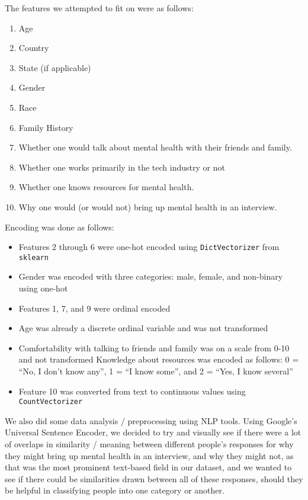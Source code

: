 \documentclass[times, twocolumn]{article}
\begin{document}
The features we attempted to fit on were as follows:

\begin{enumerate}
    \item Age
    \item Country
    \item State (if applicable)
    \item Gender
    \item Race
    \item Family History
    \item Whether one would talk about mental health with their friends and family.
    \item Whether one works primarily in the tech industry or not
    \item Whether one knows resources for mental health.
    \item Why one would (or would not) bring up mental health in an interview.
\end{enumerate}

Encoding was done as follows:

\begin{itemize}
    \item Features 2 through 6 were one-hot encoded using \texttt{DictVectorizer} from \texttt{sklearn}
    \item Gender was encoded with three categories: male, female, and non-binary using one-hot
    \item Features 1, 7, and 9 were ordinal encoded
    \item Age was already a discrete ordinal variable and was not transformed
    \item Comfortability with talking to friends and family was on a scale from 0-10 and not transformed
Knowledge about resources was encoded as follows: 0 = “No, I don’t know any”, 1 = “I know some”, and 2 = “Yes, I know several”
    \item Feature 10 was converted from text to continuous values using \texttt{CountVectorizer}
\end{itemize}

We also did some data analysis / preprocessing using NLP tools. Using Google’s
Universal Sentence Encoder, we decided to try and visually see if there were a lot
of overlaps in similarity / meaning between different people’s responses for
why they might bring up mental health in an interview, and why they might not,
as that was the most prominent text-based field in our dataset, and we wanted to
see if there could be similarities drawn between all of these responses, should
they be helpful in classifying people into one category or another.
\end{document}
